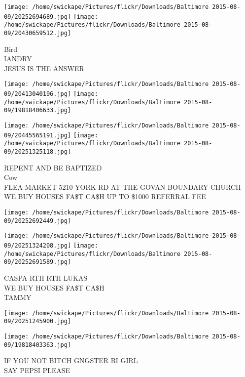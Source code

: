 \documentclass[10pt,letterpaper]{article}
\begin{document}
\vspace{0.25in}
\texttt{[image: /home/swickape/Pictures/flickr/Downloads/Baltimore 2015-08-09/20252694689.jpg]}
\texttt{[image: /home/swickape/Pictures/flickr/Downloads/Baltimore 2015-08-09/20430659512.jpg]}

Bird\\
IANDRY\\
JESUS IS THE ANSWER\\
\pagebreak

\texttt{[image: /home/swickape/Pictures/flickr/Downloads/Baltimore 2015-08-09/20413040196.jpg]}
\texttt{[image: /home/swickape/Pictures/flickr/Downloads/Baltimore 2015-08-09/19818406633.jpg]}

\texttt{[image: /home/swickape/Pictures/flickr/Downloads/Baltimore 2015-08-09/20445565191.jpg]}
\texttt{[image: /home/swickape/Pictures/flickr/Downloads/Baltimore 2015-08-09/20251325118.jpg]}

REPENT AND BE BAPTIZED\\
Cow\\
FLEA MARKET 5210 YORK RD AT THE GOVAN BOUNDARY CHURCH\\
WE BUY HOUSES FA\$T CA\$H UP TO \$1000 REFERRAL FEE\\
\pagebreak

\texttt{[image: /home/swickape/Pictures/flickr/Downloads/Baltimore 2015-08-09/20252692449.jpg]}

\vspace{0.25in}
\texttt{[image: /home/swickape/Pictures/flickr/Downloads/Baltimore 2015-08-09/20251324208.jpg]}
\texttt{[image: /home/swickape/Pictures/flickr/Downloads/Baltimore 2015-08-09/20252691589.jpg]}

CASPA RTH RTH LUKAS\\
WE BUY HOUSES FA\$T CA\$H\\
TAMMY\\
\pagebreak

\texttt{[image: /home/swickape/Pictures/flickr/Downloads/Baltimore 2015-08-09/20251245900.jpg]}

\vspace{0.25in}
\texttt{[image: /home/swickape/Pictures/flickr/Downloads/Baltimore 2015-08-09/19818403363.jpg]}

IF YOU NOT BITCH GNGSTER BI GIRL\\
SAY PEPSI PLEASE\\
\pagebreak
\end{document}
